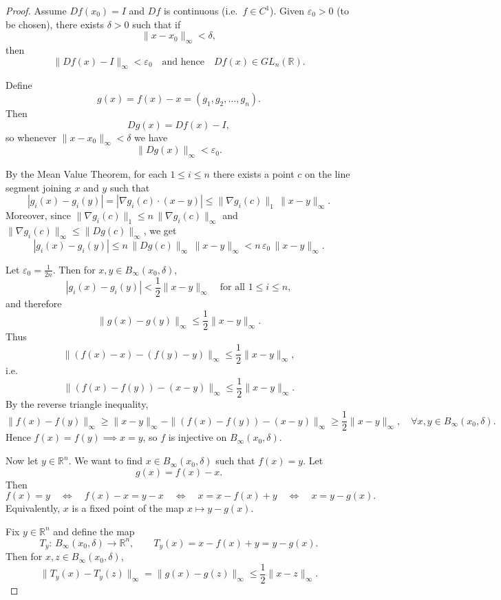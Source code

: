 \documentclass[11pt,openany]{book}
\theoremstyle{plain}
\theoremstyle{definition}
\theoremstyle{remark}
\begin{document}
\begin{proof}
Assume $Df(x_0)=I$ and $Df$ is continuous (i.e.\ $f\in C^1$). Given $\varepsilon_0>0$ (to be chosen), there exists $\delta>0$ such that if
\[
\|x-x_0\|_\infty<\delta,
\]
then
\[
\|Df(x)-I\|_\infty<\varepsilon_0
\quad\text{and hence}\quad
Df(x)\in GL_n(\mathbb{R}).
\]

Define
\[
g(x)=f(x)-x=(g_1,g_2,\dots,g_n).
\]
Then
\[
Dg(x)=Df(x)-I,
\]
so whenever $\|x-x_0\|_\infty<\delta$ we have
\[
\|Dg(x)\|_\infty<\varepsilon_0.
\]

By the Mean Value Theorem, for each $1\le i\le n$ there exists a point $c$ on the line segment joining $x$ and $y$ such that
\[
|g_i(x)-g_i(y)|
=|\nabla g_i(c)\cdot (x-y)|
\le \|\nabla g_i(c)\|_1\,\|x-y\|_\infty.
\]
Moreover, since $\|\nabla g_i(c)\|_1\le n\,\|\nabla g_i(c)\|_\infty$ and $\|\nabla g_i(c)\|_\infty\le \|Dg(c)\|_\infty$, we get
\[
|g_i(x)-g_i(y)|
\le n\,\|Dg(c)\|_\infty\,\|x-y\|_\infty
< n\,\varepsilon_0\,\|x-y\|_\infty.
\]

Let $\varepsilon_0=\frac{1}{2n}$. Then for $x,y\in B_\infty(x_0,\delta)$,
\[
|g_i(x)-g_i(y)|<\frac12\|x-y\|_\infty
\quad\text{for all }1\le i\le n,
\]
and therefore
\[
\|g(x)-g(y)\|_\infty\le \frac12\|x-y\|_\infty.
\]
Thus
\[
\|(f(x)-x)-(f(y)-y)\|_\infty \le \frac12\|x-y\|_\infty,
\]
i.e.
\[
\|(f(x)-f(y))-(x-y)\|_\infty \le \frac12\|x-y\|_\infty.
\]
By the reverse triangle inequality,
\[
\|f(x)-f(y)\|_\infty
\ge \|x-y\|_\infty - \|(f(x)-f(y))-(x-y)\|_\infty
\ge \frac12\|x-y\|_\infty,
\quad \forall x,y\in B_\infty(x_0,\delta).
\]
Hence $f(x)=f(y)\implies x=y$, so $f$ is injective on $B_\infty(x_0,\delta)$.

Now let $y\in\mathbb{R}^n$. We want to find $x\in B_\infty(x_0,\delta)$ such that $f(x)=y$.
Let
\[
g(x)=f(x)-x.
\]
Then
\[
f(x)=y
\quad\Longleftrightarrow\quad
f(x)-x=y-x
\quad\Longleftrightarrow\quad
x=x-f(x)+y
\quad\Longleftrightarrow\quad
x=y-g(x).
\]
Equivalently, $x$ is a fixed point of the map $x\mapsto y-g(x)$.

Fix $y\in\mathbb{R}^n$ and define the map
\[
T_y:\, B_\infty(x_0,\delta)\to \mathbb{R}^n,
\qquad
T_y(x)=x-f(x)+y = y-g(x).
\]
Then for $x,z\in B_\infty(x_0,\delta)$,
\[
\|T_y(x)-T_y(z)\|_\infty
=\|g(x)-g(z)\|_\infty
\le \frac12\|x-z\|_\infty.
\]


\end{proof}
\end{document}
